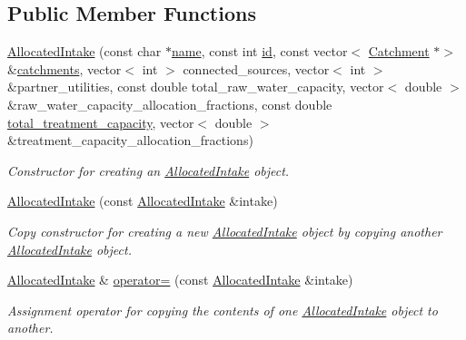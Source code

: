 \subsection*{Public Member Functions}
\begin{DoxyCompactItemize}
\item 
\mbox{\hyperlink{classAllocatedIntake_a06653dc837c927a68ab809234d78f505}{Allocated\+Intake}} (const char $\ast$\mbox{\hyperlink{classWaterSource_a846ea74c5b453d014f594d41fee8c765}{name}}, const int \mbox{\hyperlink{classWaterSource_a6eafe5dfefd317877d1244e8a7c6e742}{id}}, const vector$<$ \mbox{\hyperlink{classCatchment}{Catchment}} $\ast$$>$ \&\mbox{\hyperlink{classWaterSource_a8c18c34f23f8a06685c1d12f462ed830}{catchments}}, vector$<$ int $>$ connected\+\_\+sources, vector$<$ int $>$ \&partner\+\_\+utilities, const double total\+\_\+raw\+\_\+water\+\_\+capacity, vector$<$ double $>$ \&raw\+\_\+water\+\_\+capacity\+\_\+allocation\+\_\+fractions, const double \mbox{\hyperlink{classWaterSource_a2fdfd5ff7d103e71108cf2a31babaccb}{total\+\_\+treatment\+\_\+capacity}}, vector$<$ double $>$ \&treatment\+\_\+capacity\+\_\+allocation\+\_\+fractions)
\begin{DoxyCompactList}\small\item\em Constructor for creating an {\ttfamily \mbox{\hyperlink{classAllocatedIntake}{Allocated\+Intake}}} object. \end{DoxyCompactList}\item 
\mbox{\hyperlink{classAllocatedIntake_a39f2cd728b88fa1503bbe32a9165f654}{Allocated\+Intake}} (const \mbox{\hyperlink{classAllocatedIntake}{Allocated\+Intake}} \&intake)
\begin{DoxyCompactList}\small\item\em Copy constructor for creating a new {\ttfamily \mbox{\hyperlink{classAllocatedIntake}{Allocated\+Intake}}} object by copying another {\ttfamily \mbox{\hyperlink{classAllocatedIntake}{Allocated\+Intake}}} object. \end{DoxyCompactList}\item 
\mbox{\hyperlink{classAllocatedIntake}{Allocated\+Intake}} \& \mbox{\hyperlink{classAllocatedIntake_a86afa1536bf7ee7945f2c567c43ffb6b}{operator=}} (const \mbox{\hyperlink{classAllocatedIntake}{Allocated\+Intake}} \&intake)
\begin{DoxyCompactList}\small\item\em Assignment operator for copying the contents of one {\ttfamily \mbox{\hyperlink{classAllocatedIntake}{Allocated\+Intake}}} object to another. \end{DoxyCompactList}\item 
$$
\end{DoxyCompactItemize}
